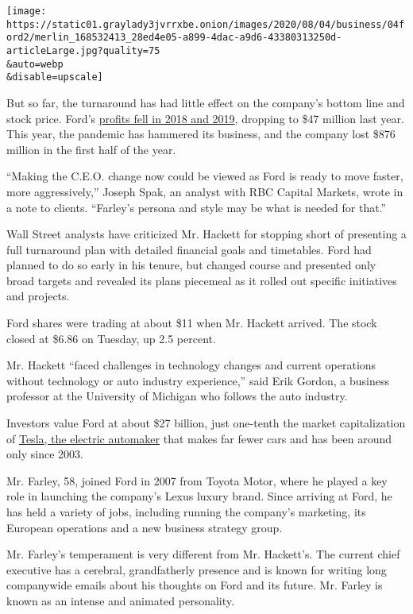 \texttt{[image: https://static01.graylady3jvrrxbe.onion/images/2020/08/04/business/04ford2/merlin\_168532413\_28ed4e05-a899-4dac-a9d6-43380313250d-articleLarge.jpg?quality=75\\\&auto=webp\\\&disable=upscale]}

But so far, the turnaround has had little effect on the company's bottom
line and stock price. Ford's
\href{https://s23.q4cdn.com/799033206/files/doc_financials/quarterly/2019/q4/Ford-4Q2019-Earnings-Press-Release.pdf}{profits
fell in 2018 and 2019}, dropping to \$47 million last year. This year,
the pandemic has hammered its business, and the company lost \$876
million in the first half of the year.

``Making the C.E.O. change now could be viewed as Ford is ready to move
faster, more aggressively,'' Joseph Spak, an analyst with RBC Capital
Markets, wrote in a note to clients. ``Farley's persona and style may be
what is needed for that.''

Wall Street analysts have criticized Mr. Hackett for stopping short of
presenting a full turnaround plan with detailed financial goals and
timetables. Ford had planned to do so early in his tenure, but changed
course and presented only broad targets and revealed its plans piecemeal
as it rolled out specific initiatives and projects.

Ford shares were trading at about \$11 when Mr. Hackett arrived. The
stock closed at \$6.86 on Tuesday, up 2.5 percent.

Mr. Hackett ``faced challenges in technology changes and current
operations without technology or auto industry experience,'' said Erik
Gordon, a business professor at the University of Michigan who follows
the auto industry.

Investors value Ford at about \$27 billion, just one-tenth the market
capitalization of
\href{https://www.nytimes3xbfgragh.onion/topic/company/tesla-motors-inc}{Tesla,
the electric automaker} that makes far fewer cars and has been around
only since 2003.

Mr. Farley, 58, joined Ford in 2007 from Toyota Motor, where he played a
key role in launching the company's Lexus luxury brand. Since arriving
at Ford, he has held a variety of jobs, including running the company's
marketing, its European operations and a new business strategy group.

Mr. Farley's temperament is very different from Mr. Hackett's. The
current chief executive has a cerebral, grandfatherly presence and is
known for writing long companywide emails about his thoughts on Ford and
its future. Mr. Farley is known as an intense and animated personality.


